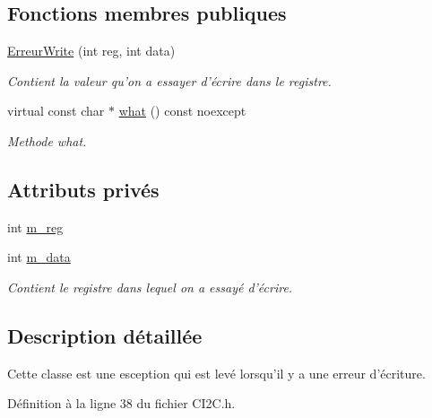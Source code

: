 \subsection*{Fonctions membres publiques}
\begin{DoxyCompactItemize}
\item 
\hyperlink{class_c_i2_c_1_1_erreur_write_a8d3b2f6b46d6bb5e4b26e5fdce8e80b4}{Erreur\+Write} (int reg, int data)
\begin{DoxyCompactList}\small\item\em Contient la valeur qu'on a essayer d'écrire dans le registre. \end{DoxyCompactList}\item 
virtual const char $\ast$ \hyperlink{class_c_i2_c_1_1_erreur_write_ad76aa069d233146923c4a244d2da9665}{what} () const noexcept
\begin{DoxyCompactList}\small\item\em Methode what. \end{DoxyCompactList}\end{DoxyCompactItemize}
\subsection*{Attributs privés}
\begin{DoxyCompactItemize}
\item 
int \hyperlink{class_c_i2_c_1_1_erreur_write_a0271678b0343dd18ad8113ab3dd579d2}{m\+\_\+reg}
\item 
int \hyperlink{class_c_i2_c_1_1_erreur_write_a3ba1d239d00892177274b494e987862b}{m\+\_\+data}
\begin{DoxyCompactList}\small\item\em Contient le registre dans lequel on a essayé d'écrire. \end{DoxyCompactList}\end{DoxyCompactItemize}


\subsection{Description détaillée}
Cette classe est une esception qui est levé lorsqu'il y a une erreur d'écriture. 

Définition à la ligne 38 du fichier C\+I2\+C.\+h.



